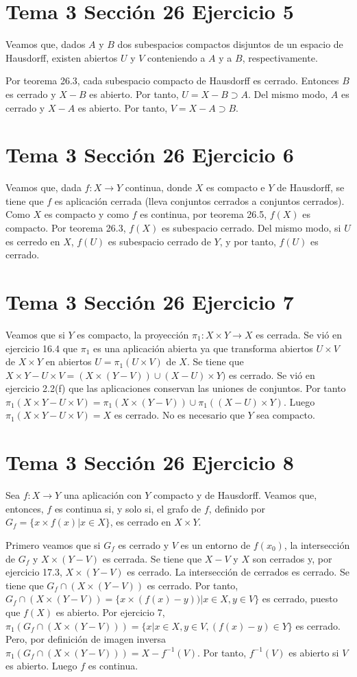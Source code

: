 \documentclass{article}
\begin{document}
\section{Tema 3 Sección 26 Ejercicio 5}
Veamos que, dados  $A$ y $B$ dos subespacios compactos disjuntos de un espacio de Hausdorff, existen abiertos $U$ y $V$ conteniendo a $A$ y a $B$, respectivamente.

Por teorema 26.3, cada subespacio compacto de Hausdorff es cerrado. Entonces $B$ es cerrado y $X-B$ es abierto. Por tanto, $U=X-B\supset A$. Del mismo modo, $A$ es cerrado y $X-A$ es abierto. Por tanto, $V=X-A\supset B$.
\section{Tema 3 Sección 26 Ejercicio 6}
Veamos que, dada $f:X\rightarrow Y$ continua, donde $X$ es compacto e $Y$ de Hausdorff, se tiene que $f$ es aplicación cerrada (lleva conjuntos cerrados a conjuntos cerrados). Como $X$ es compacto y como $f$ es continua, por teorema 26.5, $f(X)$ es compacto. Por teorema 26.3, $f(X)$ es subespacio cerrado. Del mismo modo, si $U$ es cerredo en $X$, $f(U)$ es subespacio cerrado de $Y$, y por tanto, $f(U)$ es cerrado.
\section{Tema 3 Sección 26 Ejercicio 7}
Veamos que si $Y$ es compacto, la proyección $\pi_1:X\times Y\rightarrow X$ es cerrada. Se vió en ejercicio 16.4 que $\pi_1$ es una aplicación abierta ya que transforma abiertos $U\times V$ de $X\times Y$ en abiertos $U=\pi_1(U\times V)$ de $X$. Se tiene que $X\times Y-U\times V=(X\times(Y-V))\cup (X-U)\times Y)$ es cerrado. Se vió en ejercicio 2.2(f) que las aplicaciones conservan las uniones de conjuntos. Por tanto $\pi_1(X\times Y-U\times V)=\pi_1(X\times(Y-V))\cup\pi_1((X-U)\times Y)$. Luego $\pi_1(X\times Y-U\times V)=X$ es cerrado. No es necesario que $Y$ sea compacto.
\section{Tema 3 Sección 26 Ejercicio 8}
Sea $f:X\rightarrow Y$ una aplicación con $Y$ compacto y de Hausdorff. Veamos que, entonces, $f$ es continua si, y solo si, el grafo de $f$, definido por $G_f=\{x\times f(x)|x\in X\}$, es cerrado en $X\times Y$.

Primero veamos que si $G_f$ es cerrado y $V$ es un entorno de $f(x_0)$, la intersección de $G_f$ y $X\times (Y-V)$ es cerrada. Se tiene que $X-V$ y $X$ son cerrados y, por ejercicio 17.3, $X\times (Y-V)$ es cerrado. La intersección de cerrados es cerrado. Se tiene que $G_f\cap (X\times (Y-V))$ es cerrado. Por tanto, $G_f\cap (X\times (Y-V))=\{x\times (f(x)-y))|x\in X,y\in V\}$ es cerrado, puesto que $f(X)$ es abierto. Por ejercicio 7, $\pi_1\left(G_f\cap (X\times (Y-V))\right)=\{ x|x\in X,y\in V,(f(x)-y)\in Y\}$ es cerrado. Pero, por definición de imagen inversa $\pi_1\left(G_f\cap (X\times (Y-V))\right)=X-f^{-1}(V)$. Por tanto, $f^{-1}(V)$ es abierto si $V$ es abierto. Luego $f$ es continua.
\end{document}
